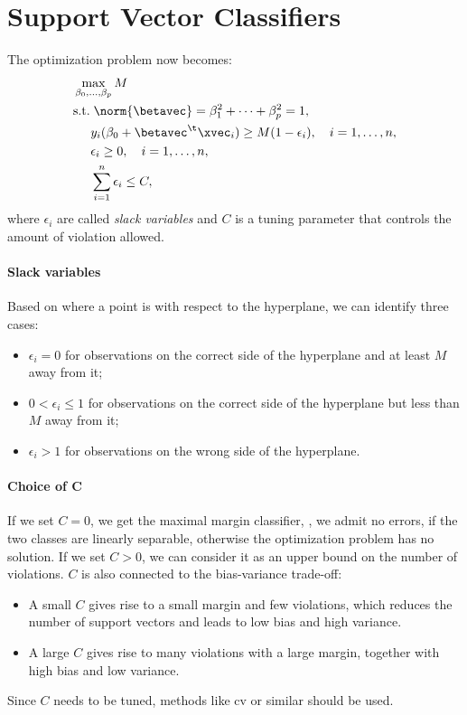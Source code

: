 \section{Support Vector Classifiers}

The optimization problem now becomes:
\begin{equation}
    \begin{aligned}
         & \max_{\beta_0, \ldots, \beta_p} M                                                                \\
         & \text{s.t.}\; \norm{\betavec} = \beta^2_1 + \dots + \beta^2_p = 1,                                                  \\
         & \phantom{s.t.} y_i(\beta_0 + \betavec^\t\xvec_i) \geq M(1 - \epsilon_i), \quad i = 1, \ldots, n, \\
         & \phantom{s.t.} \epsilon_i \geq 0, \quad i = 1, \ldots, n,                                        \\
         & \phantom{s.t.} \sum_{i = 1}^n \epsilon_i \leq C,
    \end{aligned}
\end{equation}
where $\epsilon_i$ are called \emph{slack variables} and $C$ is a tuning parameter that controls the amount of violation allowed.

\paragraph{Slack variables}

Based on where a point is with respect to the hyperplane, we can identify three cases:
\begin{itemize}
    \item $\epsilon_i = 0$ for observations on the correct side of the hyperplane and at least $M$ away from it;
    \item $0 < \epsilon_i \leq 1$ for observations on the correct side of the hyperplane but less than $M$ away from it;
    \item $\epsilon_i > 1$ for observations on the wrong side of the hyperplane.
\end{itemize}

\paragraph{Choice of $\bm{C}$}

If we set $C = 0$, we get the maximal margin classifier, \ie, we admit no errors, if the two classes are linearly separable, otherwise the optimization problem has no solution. If we set $C > 0$, we can consider it as an upper bound on the number of violations. $C$ is also connected to the bias-variance trade-off:
\begin{itemize}
    \item A small $C$ gives rise to a small margin and few violations, which reduces the number of support vectors and leads to low bias and high variance.
    \item A large $C$ gives rise to many violations with a large margin, together with high bias and low variance.
\end{itemize}

Since $C$ needs to be tuned, methods like \acs{cv} or similar should be used.
